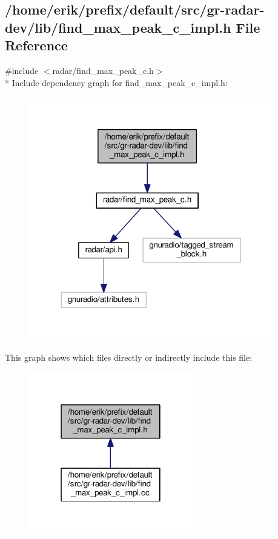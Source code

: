 \subsection{/home/erik/prefix/default/src/gr-\/radar-\/dev/lib/find\+\_\+max\+\_\+peak\+\_\+c\+\_\+impl.h File Reference}
\label{find__max__peak__c__impl_8h}
{\ttfamily \#include $<$radar/find\+\_\+max\+\_\+peak\+\_\+c.\+h$>$}\\*
Include dependency graph for find\+\_\+max\+\_\+peak\+\_\+c\+\_\+impl.\+h\+:
\nopagebreak
\begin{figure}[H]
\begin{center}
\leavevmode
\includegraphics[width=302pt]{d2/db9/find__max__peak__c__impl_8h__incl}
\end{center}
\end{figure}
This graph shows which files directly or indirectly include this file\+:
\nopagebreak
\begin{figure}[H]
\begin{center}
\leavevmode
\includegraphics[width=202pt]{d8/db6/find__max__peak__c__impl_8h__dep__incl}
\end{center}
\end{figure}
